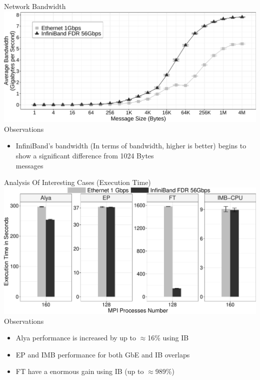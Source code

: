 \documentclass{beamer}
\begin{document}
\begin{frame}{Network Bandwidth}
\includegraphics[width=\textwidth]{SLIDES/img/Bandwidth.pdf}
\vfill
\pause Observations
\begin{itemize}
    \item InfiniBand's bandwidth (In terms of bandwidth, higher is better) begins to show a \alert{significant difference} from 1024 Bytes \\messages
\end{itemize}
\end{frame}

\begin{frame}{Analysis Of Interesting Cases (Execution Time)}
\includegraphics[width=\textwidth]{SLIDES/img/FT-EP-Alya-IMB.pdf}
\pause Observations
\begin{itemize}
    \item Alya performance is increased by up to \alert{$\approx$16\%} using IB
    \pause\item EP and IMB performance for both GbE and IB \alert{overlaps}
    \pause\item FT have a enormous gain using IB (\alert{up to $\approx$989\%})
\end{itemize}
\end{frame}
\end{document}
